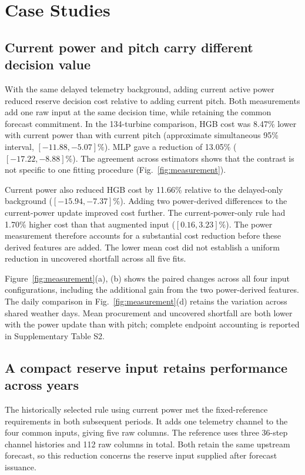 \section{Case Studies}
\label{sec:results}

\subsection{Current power and pitch carry different decision value}
With the same delayed telemetry background, adding current active power reduced reserve decision cost relative to adding current pitch. Both measurements add one raw input at the same decision time, while retaining the common forecast commitment. In the 134-turbine comparison, HGB cost was 8.47\% lower with current power than with current pitch (approximate simultaneous 95\% interval, $[-11.88,-5.07]\%$). MLP gave a reduction of 13.05\% ($[-17.22,-8.88]\%$). The agreement across estimators shows that the contrast is not specific to one fitting procedure (Fig.~\ref{fig:measurement}).

Current power also reduced HGB cost by 11.66\% relative to the delayed-only background ($[-15.94,-7.37]\%$). Adding two power-derived differences to the current-power update improved cost further. The current-power-only rule had 1.70\% higher cost than that augmented input ($[0.16,3.23]\%$). The power measurement therefore accounts for a substantial cost reduction before these derived features are added. The lower mean cost did not establish a uniform reduction in uncovered shortfall across all five fits.

Figure~\ref{fig:measurement}(a), (b) shows the paired changes across all four input configurations, including the additional gain from the two power-derived features. The daily comparison in Fig.~\ref{fig:measurement}(d) retains the variation across shared weather days. Mean procurement and uncovered shortfall are both lower with the power update than with pitch; complete endpoint accounting is reported in Supplementary Table S2.

\subsection{A compact reserve input retains performance across years}
The historically selected rule using current power met the fixed-reference requirements in both subsequent periods. It adds one telemetry channel to the four common inputs, giving five raw columns. The reference uses three 36-step channel histories and 112 raw columns in total. Both retain the same upstream forecast, so this reduction concerns the reserve input supplied after forecast issuance.

